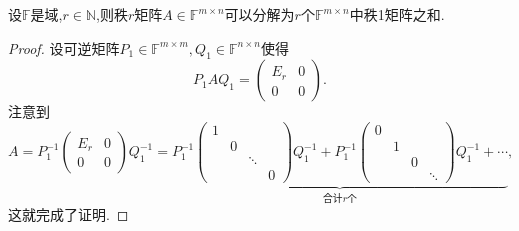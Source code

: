 \documentclass[../../main.tex]{subfiles}%
\begin{document}
\begin{theorem}[秩一分解]\label{theorem:秩一分解}
设\( \mathbb{F} \)是域,\( r \in \mathbb{N} \),则秩\( r \)矩阵\( A \in \mathbb{F}^{m \times n} \)可以分解为\( r \)个\( \mathbb{F}^{m \times n} \)中秩1矩阵之和.
\end{theorem}
\begin{proof}

设可逆矩阵\( P_1 \in \mathbb{F}^{m \times m}, Q_1 \in \mathbb{F}^{n \times n} \)使得
\[
P_1 A Q_1 = \begin{pmatrix} E_r & 0 \\ 0 & 0 \end{pmatrix}.
\]
注意到
\[
A = P_1^{-1} \begin{pmatrix} E_r & 0 \\ 0 & 0 \end{pmatrix} Q_1^{-1} = \underbrace{P_1^{-1} \begin{pmatrix} 1 & & \\ & 0 & \\ & & \ddots \\ & & & 0 \end{pmatrix} Q_1^{-1} + P_1^{-1} \begin{pmatrix} 0 & & \\ & 1 & \\ & & 0 \\ & & & \ddots \end{pmatrix} Q_1^{-1} + \cdots}_{\text{合计} r \text{个}},
\]
这就完成了证明.

\end{proof}
\end{document}
